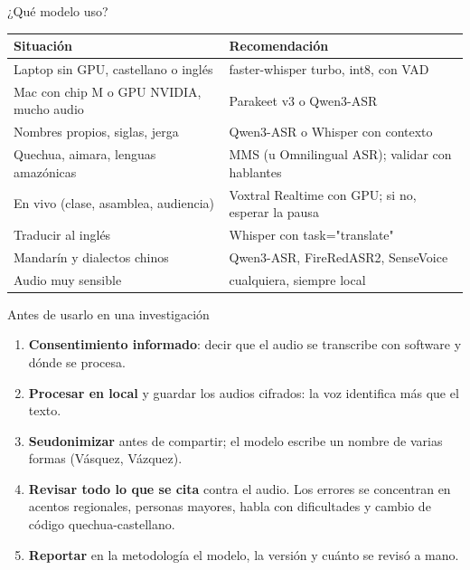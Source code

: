 \documentclass[aspectratio=169,11pt]{beamer}
\newcommand{\cod}[1]{{\small\ttfamily #1}}
\begin{document}
\begin{frame}{¿Qué modelo uso?}
  \small
  \begin{tabular}{p{6.2cm}p{6.6cm}}
    \toprule
    \textbf{Situación} & \textbf{Recomendación} \\
    \midrule
    Laptop sin GPU, castellano o inglés & faster-whisper turbo, int8, con VAD \\
    Mac con chip M o GPU NVIDIA, mucho audio & Parakeet v3 o Qwen3-ASR \\
    Nombres propios, siglas, jerga & Qwen3-ASR o Whisper con contexto \\
    Quechua, aimara, lenguas amazónicas & MMS (u Omnilingual ASR); validar con hablantes \\
    En vivo (clase, asamblea, audiencia) & Voxtral Realtime con GPU; si no, esperar la pausa \\
    Traducir al inglés & Whisper con \cod{task="translate"} \\
    Mandarín y dialectos chinos & Qwen3-ASR, FireRedASR2, SenseVoice \\
    Audio muy sensible & cualquiera, \alert{siempre local} \\
    \bottomrule
  \end{tabular}
\end{frame}

\begin{frame}{Antes de usarlo en una investigación}
  \begin{enumerate}
    \item \textbf{Consentimiento informado}: decir que el audio se transcribe con software y dónde se procesa.
    \item \textbf{Procesar en local} y guardar los audios cifrados: la voz identifica más que el texto.
    \item \textbf{Seudonimizar} antes de compartir; el modelo escribe un nombre de varias formas (Vásquez, Vázquez).
    \item \textbf{Revisar todo lo que se cita} contra el audio. Los errores se concentran en acentos regionales,
          personas mayores, habla con dificultades y cambio de código quechua-castellano.
    \item \textbf{Reportar} en la metodología el modelo, la versión y cuánto se revisó a mano.
  \end{enumerate}
\end{frame}
\end{document}
